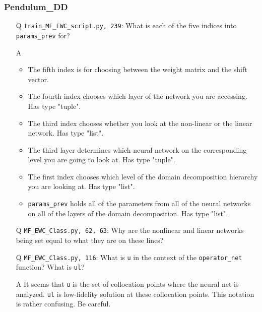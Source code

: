 \documentclass{article}
\begin{document}
\subsubsection*{Pendulum\_DD}
\begin{itemize}
	\item[Q] \verb|train_MF_EWC_script.py, 239|: What is each of the five indices into \verb|params_prev| for?
	\item[A]
	\begin{itemize}
		\item The fifth index is for choosing between the weight matrix and the shift vector. 
		\item The fourth index chooses which layer of the network you are accessing. Has type "tuple".
		\item The third index chooses whether you look at the non-linear or the linear network. Has type "list".
		\item The third layer determines which neural network on the corresponding level you are going to look at. Has type "tuple".
		\item The first index chooses which level of the domain decomposition hierarchy you are looking at. Has type "list".
		\item \verb|params_prev| holds all of the parameters from all of the neural networks on all of the layers of the domain decomposition. Has type "list".
	\end{itemize}
	\item[Q] \verb|MF_EWC_Class.py, 62, 63|: Why are the nonlinear and linear networks being set equal to what they are on these lines?
	\item[Q] \verb|MF_EWC_Class.py, 116|: What is \verb|u| in the context of the \verb|operator_net| function? What is \verb|ul|?
	\item[A] It seems that \verb|u| is the set of collocation points where the neural net is analyzed. \verb|ul| is low-fidelity solution at these collocation points. This notation is rather confusing. Be careful.
\end{itemize}
\end{document}
